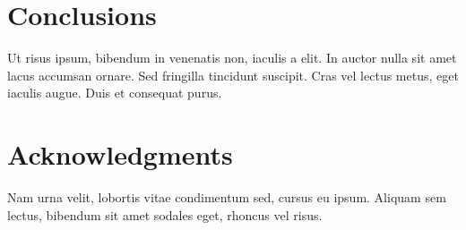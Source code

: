 \documentclass{snamc2013}
\begin{document}
\section{Conclusions}

Ut risus ipsum, bibendum in venenatis non, iaculis a elit. In auctor nulla sit
amet lacus accumsan ornare. Sed fringilla tincidunt suscipit. Cras vel lectus
metus, eget iaculis augue. Duis et consequat purus.

\section*{Acknowledgments}

Nam urna velit, lobortis vitae condimentum sed, cursus eu ipsum. Aliquam sem
lectus, bibendum sit amet sodales eget, rhoncus vel risus.



\end{document}
